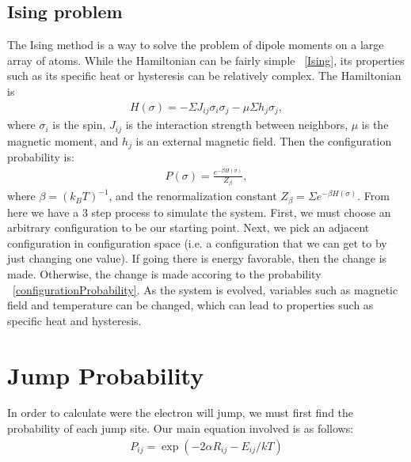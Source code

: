 \subsection{Ising problem}
The Ising method is a way to solve the problem of dipole moments on a large array of atoms. While the Hamiltonian can be fairly simple ~\ref{Ising}, its properties such as its specific heat or hysteresis can be relatively complex.   
The Hamiltonian is 
\begin{eqnarray}
H(\sigma) = - \Sigma J_{ij} \sigma_i \sigma_j - \mu \Sigma h_j \sigma_j , 
\label{Ising}
\end{eqnarray}
where $\sigma_i$ is the spin, $J_{ij}$ is the interaction strength between neighbors, $\mu$ is the magnetic moment, and $h_j$ is an external magnetic field. Then the configuration probability is:
\begin{eqnarray}
P(\sigma) = \frac {e^{-\beta H(\sigma) }} {Z_\beta },
\label{configurationProbability}
\end{eqnarray}
where $\beta = (k_B T)^{-1}$, and the renormalization constant $Z_\beta = \Sigma e^{-\beta H(\sigma)}$. From here we have a 3 step process to simulate the system. First, we must choose an arbitrary configuration to be our starting point. Next, we pick an adjacent configuration in configuration space (i.e. a configuration that we can get to by just changing one value). If going there is energy favorable, then the change is made. Otherwise, the change is made accoring to the probability ~\ref{configurationProbability}. As the system is evolved, variables such as magnetic field and temperature can be changed, which can lead to properties such as specific heat and hysteresis. 

\section{Jump Probability}

In order to calculate were the electron will jump, we must first find the probability of each jump site. Our main equation involved is as follows:
\begin{eqnarray}
P_{ij} = \exp (-2\alpha R_{ij} -  E_{ij}/kT)
\label{probability}
\end{eqnarray}


